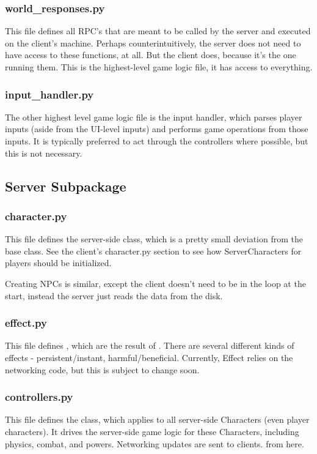 \documentclass{article}
\begin{document}
\subsubsection{world\_responses.py}
This file defines all RPC's that are meant to be called by the server and executed on the client's
machine. Perhaps counterintuitively, the server does not need to have access to these functions,
at all. But the client does, because it's the one running them. This is the highest-level game logic
file, it has access to everything.
\subsubsection{input\_handler.py}
The other highest level game logic file is the input handler, which parses player inputs (aside from
the UI-level inputs) and performs game operations from those inputs. It is typically preferred
to act through the controllers where possible, but this is not necessary.
\subsection{Server Subpackage}
\subsubsection{character.py}
This file defines the server-side  class, which is a pretty small
deviation from the base  class. See the client's character.py section
to see how ServerCharacters for players should be initialized.

Creating NPCs is similar, except the client doesn't need to be in the loop at the start, instead
the server just reads the data from the disk.

\subsubsection{effect.py}
This file defines , which are the result of .
There are several different kinds of effects - persistent/instant, harmful/beneficial.
Currently, Effect relies on the networking code, but this is subject to change soon.
\subsubsection{controllers.py}
This file defines the  class, which applies to all server-side
Characters (even player characters). It drives the server-side game logic for these
Characters, including physics, combat, and powers. Networking updates are sent to clients.
from here.
\end{document}

